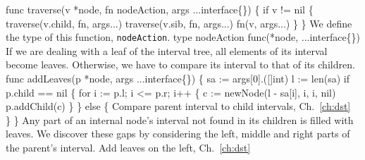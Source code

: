 func traverse(v *node, fn nodeAction, args ...interface\{\}) \{
          if v != nil \{
                  traverse(v.child, fn, args...)
                  traverse(v.sib, fn, args...)
                  fn(v, args...)
          \}
\}
\nwendcode{}\nwdocspar
We define the type of this function, \texttt{nodeAction}.
\nwenddocs{}\plusendmoddef\nwstartdeflinemarkup{}\nwenddeflinemarkup
type nodeAction func(*node, ...interface\{\})
\nwendcode{}\nwdocspar
If we are dealing with a leaf of the interval tree, all elements of
its interval become leaves.  Otherwise, we have to compare its interval
to that of its children.
\nwenddocs{}\plusendmoddef\nwstartdeflinemarkup{}\nwenddeflinemarkup
func addLeaves(p *node, args ...interface\{\}) \{
          sa := args[0].([]int)
          l := len(sa)
          if p.child == nil \{
                  for i := p.l; i <= p.r; i++ \{
                          c := newNode(l - sa[i], i, i, nil)
                          p.addChild(c)
                  \}
          \} else \{
                  \LA{}Compare parent interval to child intervals, Ch.~\ref{ch:dst}~{\nwtagstyle{}}\RA{}
          \}
\}
\nwendcode{}\nwdocspar
Any part of an internal node's interval not found in its children is
filled with leaves. We discover these gaps by considering the left,
middle and right parts of the parent's interval.
\nwenddocs{}\endmoddef\nwstartdeflinemarkup{}\nwenddeflinemarkup
\LA{}Add leaves on the left, Ch.~\ref{ch:dst}~{\nwtagstyle{}}\RA{}
